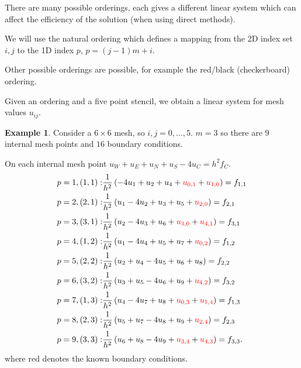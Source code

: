 \documentclass[12pt, a4paper]{article}
\theoremstyle{definition}
\newtheorem{example}[thm]{Example}
\theoremstyle{remark}
\numberwithin{equation}{section}
\begin{document}
There are many possible orderings, each gives a different linear system which can affect the efficiency of the solution (when using direct methods).

We will use the natural ordering which defines a mapping from the 2D index set $i,j$ to the 1D index $p$, \mbox{$p=(j-1)m+i$}.

Other possible orderings are possible, for example the red/black (checkerboard) ordering.

Given an ordering and a five point stencil, we obtain a linear system for mesh values $u_{ij}$.
 \newpage
 
\begin{example}
Consider a $6\times 6$ mesh, so $i,j=0,\ldots,5$. $m=3$ so there are $9$ internal mesh points and $16$ boundary conditions.

On each internal mesh point $u_W+u_E+u_N+u_S-4u_C=h^2f_C$.
\begin{align*}
p=1, (1,1):&\frac{1}{h^{2}}\left(-4 u_{1}+u_{2}+u_{4}+{\color{red}u_{0,1}}+{\color{red}u_{1,0}}\right)=f_{1,1}\\
p=2,(2,1):&\frac{1}{h^{2}}\left(u_{1}-4 u_{2}+u_{3}+u_{5}+{\color{red}u_{2,0}}\right)=f_{2,1}\\
p=3,(3,1): &\frac{1}{h^{2}}\left(u_{2}-4 u_{3}+u_{6}+{\color{red}u_{3,0}}+{\color{red}u_{4,1}}\right)=f_{3,1}\\
p=4,(1,2):&\frac{1}{h^{2}}\left(u_{1}-4 u_{4}+u_{5}+u_{7}+{\color{red}u_{0,2}}\right)=f_{1,2}\\
p=5,(2,2):&\frac{1}{h^{2}}\left(u_{2}+u_{4}-4 u_{5}+u_{6}+u_{8}\right)=f_{2,2}\\
p=6,(3,2): & \frac{1}{h^{2}}\left(u_{3}+u_{5}-4 u_{6}+u_{9}+{\color{red}u_{4,2}}\right)=f_{3,2}\\
p=7,(1,3):& \frac{1}{h^{2}}\left(u_{4}-4 u_{7}+u_{8}+{\color{red}u_{0,3}}+{\color{red}u_{1,4}}\right)=f_{1,3}\\
p=8,(2,3):&\frac{1}{h^{2}}\left(u_{5}+u_{7}-4 u_{8}+u_{9}+{\color{red}u_{2,4}}\right)=f_{2,3}\\
p=9,(3,3):&\frac{1}{h^{2}}\left(u_{6}+u_{8}-4 u_{9}+{\color{red}u_{3,4}}+{\color{red}u_{4,3}}\right)=f_{3,3}.
\end{align*}
where red denotes the known boundary conditions.


\end{example}
\end{document}
